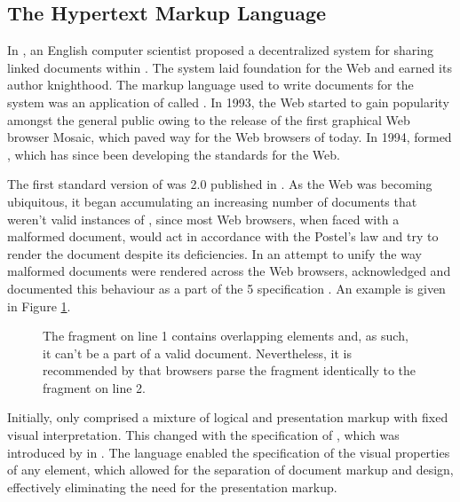 \documentclass[a5paper,10pt]{book}
\begin{document}
\subsection{The Hypertext Markup Language}
In \citeyear{bernerslee89}, an English computer scientist  proposed a decentralized system for sharing linked documents within
 \cite{bernerslee89}. The system laid foundation for the Web
and earned its author knighthood.  The markup language used to write documents
for the system was an application of  called . In
1993, the Web started to gain popularity amongst the general public owing to the
release of the first graphical Web browser Mosaic, which paved way for the Web
browsers of today. In 1994,  formed
, which has since been developing the standards for the Web.

The first standard version of  was  2.0
\cite{bernerslee95} published in \citeyear{bernerslee95}. As the Web was
becoming ubiquitous, it began accumulating an increasing number of documents
that weren't valid instances of , since most Web browsers, when
faced with a malformed document, would act in accordance with the Postel's law
and try to render the document despite its deficiencies. In an attempt to unify
the way malformed  documents were rendered across the Web
browsers,  acknowledged and documented this behaviour as a part of
the 5 specification \cite[sec.\,8.2]{hickson14}. An example is
given in Figure \ref{fig:overlapping-elements}.

\begin{figure}[b]
  \caption{The fragment on line 1 contains overlapping elements and, as such, it
    can't be a part of a valid  document. Nevertheless, it is
    recommended by  that browsers parse the fragment identically to
    the fragment on line 2.}
  \label{fig:overlapping-elements}
\end{figure}

Initially,  only comprised a mixture of logical and presentation
markup with fixed visual interpretation. This changed with the specification of
, which was introduced by  in \citeyear{lie96}. The
language enabled the specification of the visual properties of any element,
which allowed for the separation of document markup and design, effectively
eliminating the need for the presentation markup.
\end{document}
